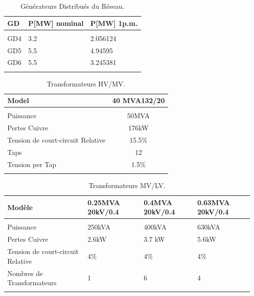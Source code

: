 \hspace{-1.7cm}
\begin{minipage}{.5\textwidth}
\begin{table}[H]
	\captionsetup{justification=centering,margin=1cm}
	\caption{Générateurs Distribués du Réseau.}
	\label{tab:generateurs_du_reseaux}
	\centering
	\begin{tabular}{m{1cm}m{1.5cm}m{1.5cm}}
		\hline
		GD&P[MW] nominal&P[MW] 1p.m.\\
		\hline\\
		GD4&3.2&2.056124\\
		GD5&5.5&4.94595\\
		GD6&5.5&3.245381\\
		\hline\\
	\end{tabular}
\end{table}	
\end{minipage}
\begin{minipage}{.5\textwidth}
\begin{table}[H]
	\captionsetup{justification=centering}
	\caption{Transformateurs HV/MV.}
	\label{tab:Transformateurs_HV/MV}
	\centering
	\begin{tabular}{lc}
		\hline
		Model&40 MVA132/20\\
		\hline\\
		Puissance&50MVA\\
		Pertes Cuivre&176kW\\
		Tension de court-circuit Relative&15.5\%\\
		Taps&12\\
		Tension per Tap&1.5\%\\
		\hline\\
	\end{tabular}
\end{table}	
\end{minipage}
\begin{table}[H]
	\captionsetup{justification=centering,margin=2cm}
	\caption{Transformateurs MV/LV.}
	\label{tab:Transformateurs_MV/LV}
	\centering
	\begin{tabular}{lm{2cm}m{2cm}m{2cm}}
		\hline
		Modèle&0.25MVA 20kV/0.4&0.4MVA 20kV/0.4&0.63MVA 20kV/0.4\\
		\hline\\
		Puissance&250kVA&400kVA&630kVA\\
		Pertes Cuivre&2.6kW&3.7 kW&5.6kW\\
		Tension de court-circuit Relative&4\%&4\%&4\%\\
		Nombres de Transformateurs&1&6&4\\
		\hline\\
	\end{tabular}
\end{table}	
